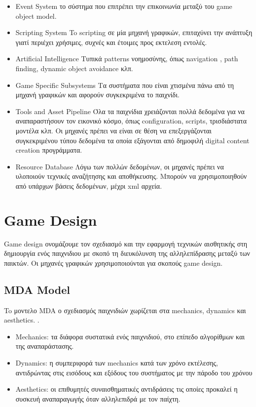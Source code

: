 \begin{itemize}
\item Event System
το σύστημα που επιτρέπει την επικοινωνία μεταξύ του game object model.
\item Scripting System
To scripting σε μία μηχανή γραφικών, επιταχύνει την ανάπτυξη γιατί περιέχει χρήσιμες, συχνές και έτοιμες προς εκτελεση εντολές.
\item Artificial Intelligence
Τυπικά patterns νοημοσύνης, όπως navigation , path finding, dynamic object avoidance κλπ.
\item Game Specific Subsystems
Τα συστήματα που είναι χτισμένα πάνω από τη μηχανή γραφικών και αφορούν συγκεκριμένα το παιχνίδι.
\item Tools and Asset Pipeline
Όλα τα παιχνίδια χρειάζονται πολλά δεδομένα για να αναπαραστήσουν τον εικονικό κόσμο, όπως configuration, scripts, τρισδιάστατα μοντέλα κλπ. Οι μηχανές πρέπει να είναι σε θέση να επεξεργάζονται συγκεκριμένου τύπου δεδομένα τα οποία εξάγονται από δημοφιλή digital content creation προγράμματα.
\item Resource Database
Λόγω των πολλών δεδομένων, οι μηχανές πρέπει να υλοποιούν τεχνικές αναζήτησης και αποθήκευσης. Μπορούν να χρησιμοποιηθούν από υπάρχων βάσεις δεδομένων, μέχρι xml αρχεία. 
\end{itemize}

\section{Game Design}
Game design ονομάζουμε τον σχεδιασμό και την εφαρμογή τεχνικών αισθητικής στη δημιουργία ενός παιχνιδιου με σκοπό τη διευκόλυνση της αλληλεπίδρασης μεταξύ των παικτών. Οι μηχανές γραφικών χρησιμοποιούνται για σκοπούς game design.
	\subsection{MDA Model}
	To μοντελο \gls{MDA} ο σχεδιασμός παιχνιδιών χωρίζεται στα mechanics, dynamics και aesthetics.
	\cite{mda04}.
	\begin{itemize}
	\item Mechanics: τα διάφορα συστατικά ενός παιχνιδιού, στο επίπεδο αλγορίθμων και της αναπαράστασης.
	\item Dynamics: η συμπεριφορά των mechanics κατά των χρόνο εκτέλεσης, αντιδρώντας στις εισόδους και εξόδους του συστήματος με την πάροδο του χρόνου
	\item Aesthetics: οι επιθυμητές συναισθηματικές αντιδράσεις τις οποίες προκαλεί η συσκευή αναπαραγωγής όταν αλληλεπιδρά με τον παίχτη.	
	\end{itemize}

